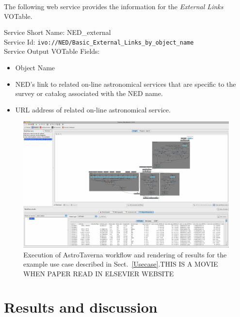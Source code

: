 \documentclass{aa}
\begin{document}
\begin{samepage}
The following web service provides the information for the \textit{External Links} VOTable.

\begin{minipage}[h]{0.9\columnwidth}
  \small \vspace{\baselineskip}
\noindent Service Short Name: NED\_external\\
Service Id: \texttt{ivo://NED/Basic\_External\_Links\_by\_object\_name}\\
Service Output VOTable Fields:
\begin{itemize}
\item Object Name
\item NED's link to related on-line astronomical services that are specific to the survey or catalog associated with the NED name.
\item URL address of related on-line astronomical service.
\end{itemize}
\vspace{\baselineskip}
\end{minipage}
\end{samepage}

\begin{figure}
\centering 
\includegraphics[width=0.99\columnwidth]{WfExec}
\caption{
Execution of AstroTaverna workflow and rendering of results for the example use case described in Sect.~\ref{Usecase}.{\color{red}THIS IS A MOVIE WHEN PAPER READ IN ELSEVIER WEBSITE}
}
\label{fig:WfExec}
\end{figure}


\section{Results and discussion}
\label{ResultsAndDiscussion}
\end{document}
